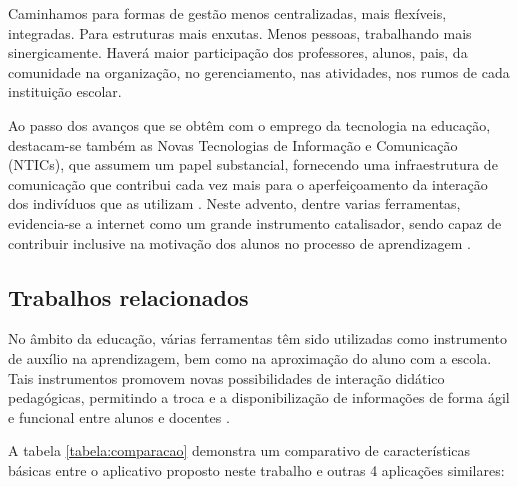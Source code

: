 \begin{citacao}
    Caminhamos para formas de gestão menos centralizadas, mais flexíveis, integradas. Para estruturas mais enxutas. Menos pessoas, trabalhando mais sinergicamente. Haverá maior participação dos professores, alunos, pais, da comunidade na organização, no gerenciamento, nas atividades, nos rumos de cada instituição escolar.
\end{citacao}

Ao passo dos avanços que se obtêm com o emprego da tecnologia na educação, destacam-se também as Novas Tecnologias de Informação e Comunicação (NTICs), que assumem um papel substancial, fornecendo uma infraestrutura de comunicação que contribui cada vez mais para o aperfeiçoamento da interação dos indivíduos que as utilizam \cite{velloso2014informatica}. Neste advento, dentre varias ferramentas, evidencia-se a internet como um grande instrumento catalisador, sendo capaz de contribuir inclusive na motivação dos alunos no processo de aprendizagem \cite{moran1997utilizar}.

\subsection{Trabalhos relacionados}

No âmbito da educação, várias ferramentas têm sido utilizadas como instrumento de auxílio na aprendizagem, bem como na aproximação do aluno com a escola. Tais instrumentos promovem novas possibilidades de interação didático pedagógicas, permitindo a troca e a disponibilização de informações de forma ágil e funcional entre alunos e docentes \cite{medeiros2018educaccao}.

A tabela \ref{tabela:comparacao} demonstra um comparativo de características básicas entre o aplicativo proposto neste trabalho e outras 4 aplicações similares: 

